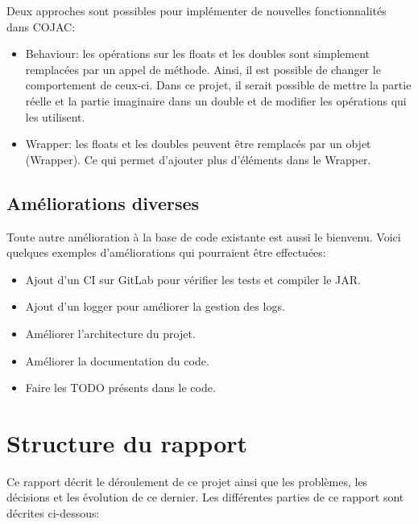 Deux approches sont possibles pour implémenter de nouvelles fonctionnalités dans \gls{COJAC}:

\begin{itemize}
    \item \Gls{Behaviour}: les opérations sur les floats et les doubles sont simplement remplacées par un appel de méthode. Ainsi, il est possible de changer le comportement de ceux-ci. Dans ce projet, il serait possible de mettre la partie réelle et la partie imaginaire dans un double et de modifier les opérations qui les utilisent.
    \item \Gls{Wrapper}: les floats et les doubles peuvent être remplacés par un objet (\gls{Wrapper}). Ce qui permet d'ajouter plus d'éléments dans le \gls{Wrapper}.
\end{itemize}

\subsection{Améliorations diverses}

Toute autre amélioration à la base de code existante est aussi le bienvenu. Voici quelques exemples d'améliorations qui pourraient être effectuées:

\begin{itemize}
    \item Ajout d'un CI sur GitLab pour vérifier les tests et compiler le \gls{JAR}.
    \item Ajout d'un logger pour améliorer la gestion des logs.
    \item Améliorer l'architecture du projet.
    \item Améliorer la documentation du code.
    \item Faire les TODO présents dans le code.
\end{itemize}

\section{Structure du rapport}

Ce rapport décrit le déroulement de ce projet ainsi que les problèmes, les décisions et les évolution de ce dernier. Les différentes parties de ce rapport sont décrites ci-dessous:

